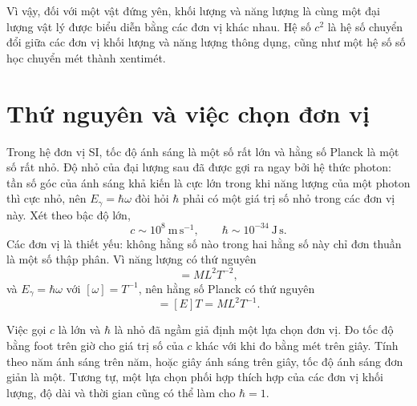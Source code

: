 Vì vậy, đối với một vật đứng yên, khối lượng và năng lượng là cùng một đại lượng vật lý được biểu diễn bằng các đơn vị khác nhau. Hệ số \(c^2\) là hệ số chuyển đổi giữa các đơn vị khối lượng và năng lượng thông dụng, cũng như một hệ số số học chuyển mét thành xentimét.

\begin{classroomqa}
\end{classroomqa}

\section{Thứ nguyên và việc chọn đơn vị}

Trong hệ đơn vị SI, tốc độ ánh sáng là một số rất lớn và hằng số Planck là một số rất nhỏ. Độ nhỏ của đại lượng sau đã được gợi ra ngay bởi hệ thức photon: tần số góc của ánh sáng khả kiến là cực lớn trong khi năng lượng của một photon thì cực nhỏ, nên \(E_\gamma=\hbar\omega\) đòi hỏi \(\hbar\) phải có một giá trị số nhỏ trong các đơn vị này. Xét theo bậc độ lớn,
\begin{equation}
c\sim 10^8\ \mathrm{m\,s^{-1}},
\qquad
\hbar\sim 10^{-34}\ \mathrm{J\,s}.
\end{equation}
Các đơn vị là thiết yếu: không hằng số nào trong hai hằng số này chỉ đơn thuần là một số thập phân. Vì năng lượng có thứ nguyên
\begin{equation}
[E]=M L^2 T^{-2},
\end{equation}
và \(E_\gamma=\hbar\omega\) với \([\omega]=T^{-1}\), nên hằng số Planck có thứ nguyên
\begin{equation}
[\hbar]=[E]T=M L^2 T^{-1}.
\end{equation}

Việc gọi \(c\) là lớn và \(\hbar\) là nhỏ đã ngầm giả định một lựa chọn đơn vị. Đo tốc độ bằng foot trên giờ cho giá trị số của \(c\) khác với khi đo bằng mét trên giây. Tính theo năm ánh sáng trên năm, hoặc giây ánh sáng trên giây, tốc độ ánh sáng đơn giản là một. Tương tự, một lựa chọn phối hợp thích hợp của các đơn vị khối lượng, độ dài và thời gian cũng có thể làm cho \(\hbar=1\).

